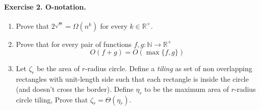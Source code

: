 \paragraph{Exercise 2. O-notation.}
\begin{enumerate}
\item Prove that \(2^{\sqrt{n}} = \Omega\left(n^k\right)\) for every \(k \in \mathbb{R}^{+}\). 
\item Prove that for every pair of functions \(f,g : \mathbb{N} \rightarrow \mathbb{R}^{+}\) \begin{equation*}
     O \left( f + g \right) = O \left( \max{\{f,g\}} \right)
\end{equation*} 


\item Let \(\zeta_r\) be the area of \(r\)-radius circle. Define a \textit{tiling} as set of non overlapping rectangles with unit-length side such that each rectangle is inside the circle (and doesn't cross the border). Define \(\eta_r\) to be the maximum area of \(r\)-radius circle tiling, Prove that \( \zeta_r = \Theta\left(\eta_r\right)\).  
\end{enumerate}






